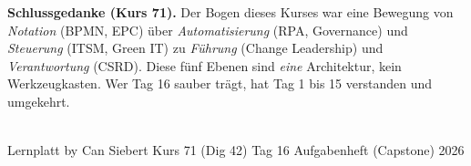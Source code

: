 \documentclass[11pt,a4paper,oneside]{article}
\begin{document}
\medskip
\noindent\textbf{Schlussgedanke (Kurs 71).} Der Bogen dieses Kurses war eine Bewegung von \emph{Notation} (BPMN, EPC) \"uber \emph{Automatisierung} (RPA, Governance) und \emph{Steuerung} (ITSM, Green IT) zu \emph{F\"uhrung} (Change Leadership) und \emph{Verantwortung} (CSRD). Diese f\"unf Ebenen sind \emph{eine} Architektur, kein Werkzeugkasten. Wer Tag 16 sauber tr\"agt, hat Tag 1 bis 15 verstanden \textendash{} und umgekehrt.

\vspace{1cm}
\noindent{\color{lpAccent}\rule{\linewidth}{0.6pt}}\\[4pt]
{\footnotesize\sffamily\color{lpGray}Lernplatt \textperiodcentered{} by Can Siebert \textperiodcentered{} Kurs 71 (Dig 42) \textperiodcentered{} Tag 16 \textperiodcentered{} Aufgabenheft (Capstone) \textperiodcentered{} \textcopyright{} 2026}
\end{document}
